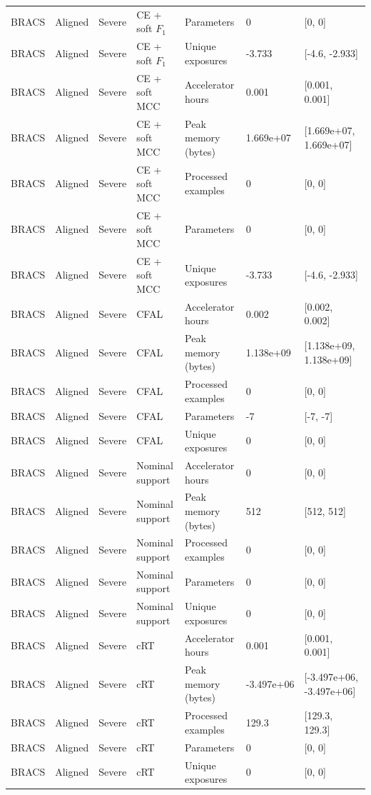 \begin{longtable}{lllllll}
BRACS & Aligned & Severe & CE + soft $F_1$ & Parameters & 0 & [0, 0] \\
BRACS & Aligned & Severe & CE + soft $F_1$ & Unique exposures & -3.733 & [-4.6, -2.933] \\
BRACS & Aligned & Severe & CE + soft MCC & Accelerator hours & 0.001 & [0.001, 0.001] \\
BRACS & Aligned & Severe & CE + soft MCC & Peak memory (bytes) & 1.669e+07 & [1.669e+07, 1.669e+07] \\
BRACS & Aligned & Severe & CE + soft MCC & Processed examples & 0 & [0, 0] \\
BRACS & Aligned & Severe & CE + soft MCC & Parameters & 0 & [0, 0] \\
BRACS & Aligned & Severe & CE + soft MCC & Unique exposures & -3.733 & [-4.6, -2.933] \\
BRACS & Aligned & Severe & CFAL & Accelerator hours & 0.002 & [0.002, 0.002] \\
BRACS & Aligned & Severe & CFAL & Peak memory (bytes) & 1.138e+09 & [1.138e+09, 1.138e+09] \\
BRACS & Aligned & Severe & CFAL & Processed examples & 0 & [0, 0] \\
BRACS & Aligned & Severe & CFAL & Parameters & -7 & [-7, -7] \\
BRACS & Aligned & Severe & CFAL & Unique exposures & 0 & [0, 0] \\
BRACS & Aligned & Severe & Nominal support & Accelerator hours & 0 & [0, 0] \\
BRACS & Aligned & Severe & Nominal support & Peak memory (bytes) & 512 & [512, 512] \\
BRACS & Aligned & Severe & Nominal support & Processed examples & 0 & [0, 0] \\
BRACS & Aligned & Severe & Nominal support & Parameters & 0 & [0, 0] \\
BRACS & Aligned & Severe & Nominal support & Unique exposures & 0 & [0, 0] \\
BRACS & Aligned & Severe & cRT & Accelerator hours & 0.001 & [0.001, 0.001] \\
BRACS & Aligned & Severe & cRT & Peak memory (bytes) & -3.497e+06 & [-3.497e+06, -3.497e+06] \\
BRACS & Aligned & Severe & cRT & Processed examples & 129.3 & [129.3, 129.3] \\
BRACS & Aligned & Severe & cRT & Parameters & 0 & [0, 0] \\
BRACS & Aligned & Severe & cRT & Unique exposures & 0 & [0, 0] \\

\end{longtable}
